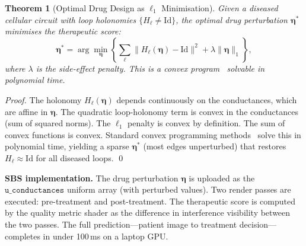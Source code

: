 \documentclass[11pt,twocolumn,a4paper]{article}
\newtheorem{theorem}{Theorem}[section]
\begin{document}
\begin{theorem}[Optimal Drug Design as $\ell_1$ Minimisation]
\label{thm:drug-design}
Given a diseased cellular circuit with loop holonomies
$\{H_\ell \neq \mathrm{Id}\}$, the optimal drug perturbation
$\boldsymbol{\eta}^*$ minimises the therapeutic score:
\begin{equation}
  \boldsymbol{\eta}^* = \arg\min_{\boldsymbol{\eta}}
  \left\{
    \sum_\ell \|H_\ell(\boldsymbol{\eta}) - \mathrm{Id}\|^2
    + \lambda \|\boldsymbol{\eta}\|_1
  \right\},
  \label{eq:drug-opt}
\end{equation}
where $\lambda$ is the side-effect penalty.  This is a convex
program~\citep{boyd2004} solvable in polynomial time.
\end{theorem}

\begin{proof}
The holonomy $H_\ell(\boldsymbol{\eta})$ depends continuously on the
conductances, which are affine in $\boldsymbol{\eta}$.  The quadratic
loop-holonomy term is convex in the conductances (sum of squared
norms).  The $\ell_1$ penalty is convex by definition.  The sum of
convex functions is convex.  Standard convex programming
methods~\citep{boyd2004} solve this in polynomial time, yielding a
sparse $\boldsymbol{\eta}^*$ (most edges unperturbed) that restores
$H_\ell \approx \mathrm{Id}$ for all diseased loops.  \qed
\end{proof}

\textbf{SBS implementation.}  The drug perturbation
$\boldsymbol{\eta}$ is uploaded as the
$\texttt{u\_conductances}$ uniform array (with perturbed values).
Two render passes are executed: pre-treatment and post-treatment.  The
therapeutic score is computed by the quality metric shader as the
difference in interference visibility between the two passes.  The
full prediction---patient image to treatment decision---completes in
under 100\,ms on a laptop GPU.
\end{document}
